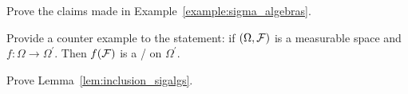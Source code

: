 \begin{problem}\label{prb:example_sigalgs}
Prove the claims made in Example~\ref{example:sigma_algebras}.
\end{problem}



\begin{problem}\label{prb:converse_preimage_sigma_algebra}
Provide a counter example to the statement: if $(\Omega, \mathcal F)$ is a measurable space and $f : \Omega \to \Omega^\prime$. Then $f(\mathcal F)$ is a \sigalg/ on $\Omega^\prime$.
\end{problem}

\begin{problem}\label{prb:inclusion_sigalgs}
Prove Lemma~\ref{lem:inclusion_sigalgs}.
\end{problem}



